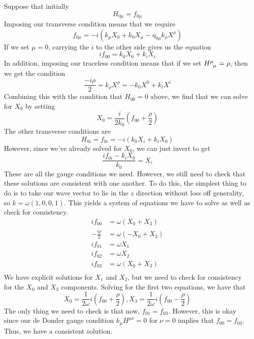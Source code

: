  Suppose that initially 
 \[
  H_{ 0 \mu }  = f _{ 0 \mu } 
 \] Imposing our transverse condition means 
 that we require
 \[
	 f _{ 0 \mu }  =  - i \left( k _ \mu X _ 0 
	 + k _ 0 X _ \mu  - \eta _{ 0 \mu } k _ \rho X ^ \rho \right)  
 \] If we set $ \mu   = 0 $, carrying the $ i$ to the
 other side gives us the equation 
 \[
  i f _{ 00 }   = k _ 0 X _ 0 + k _ i X _ i 
 \] In addition, 
 imposing our traceless condition means that 
 if we set $ H \indices{ ^ \mu  _\mu }  = \rho   $, 
 then we get the condition 
 \[
   \frac{  - i \rho }{ 2} = k _ \rho X ^ \rho  =  - k _ 0 X ^ 0 + k _ i X ^ i 
 \] Combining this with the condition 
 that $ H _{ 0 0 }  = 0 $ above, we find that 
 we can solve for $ X _ 0 $ by setting 
 \[
	 X _ 0  = \frac{ i }{ 2 k _ 0  }\left(  f _{ 00 } + \frac{\rho}{2} \right) 
 \] The other transverse 
 conditions are 
 \[
	 H  _{ 0 i }  =f _{ 0i }  = - i \left( k _ 0 X _ i + k _ i X _ 0 \right) 
 \] However, since we've already solved 
 for $ X _ 0 $, we can just invert to get 
 \[
  \frac{ i f _{ 0 i }  - k _ i X _ 0 }{ k _ 0 }  = X _ i 
 \] These are all the gauge conditions we need. 
 However, we still need to check that these solutions are consistent with one another. 
To do this, the simplest thing to do is 
to take our wave vector to lie in the $z  $ direction 
without loss off generality, so $ k = \omega \left( 1, 0 , 0 , 1 \right) $. 
This yields a system of equations we have to solve 
as well as check for consistency. 
\begin{align*}
	i f_{00 } &=  \omega \left( X _ 0 + X _ 3  \right)   \\
	- \frac{ i \rho }{ 2 } &  = \omega (  - X_0 + X_3) \\
	i f _{ 01  } &=  \omega X _ 1 \\ 
	i f _{ 02 } &= \omega X_2 \\
	i f_{ 0 3 } &=  \omega \left(  X _ 0 + X _ 3 \right)  \\
\end{align*}
We have explicit solutions for $ X _ 1 $ and $ X _ 2 $, 
but we need to check for consistency for the $ X _ 0 $ and 
$ X _ 3 $ components. 
Solving for the first two equations, we have 
that
\[
	X_ 0  = \frac{1}{ 2 \omega } i \left( f _{ 00  } + \frac{\rho}{2 }  \right), 
	X_3 = \frac{1}{2 \omega } i \left( f_{00}  - \frac{\rho}{2 } \right) 
\] The only thing we need to check is that now, 
$ f _{ 01 } = f_{ 0 3 } $. However, this 
is okay since our de Donder gauge condition $ k_ \mu H ^{ \mu \nu }  = 0 $ for 
$ \nu  =  0 $ implies that $ f _{ 00 } = f _{ 0 3 } $. 
Thus, we have a consistent solution. 



